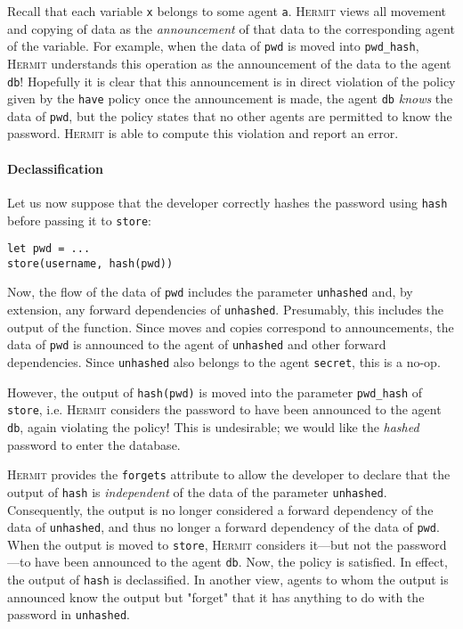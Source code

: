 \documentclass[letterpaper,twocolumn,10pt]{article}
\newcommand{\Hermit}{\textsc{Hermit}}
\begin{document}
Recall that each variable \lstinline{x} belongs to some agent \lstinline{a}.
\Hermit{} views all movement and copying of data as the \emph{announcement} of that data to the
corresponding agent of the variable. For example, when the data of \lstinline{pwd} is moved into
\lstinline{pwd_hash}, \Hermit{} understands this operation as the announcement of the data to the
agent \lstinline{db}! Hopefully it is clear that this announcement is in direct violation of the
policy given by the \lstinline{have} policy once the announcement is made, the agent
\lstinline{db} \emph{knows} the data of \lstinline{pwd}, but the policy states that no other agents
are permitted to know the password. \Hermit{} is able to compute this violation and report an error.

\paragraph{Declassification}
Let us now suppose that the developer correctly hashes the password using \lstinline{hash} before
passing it to \lstinline{store}:

\begin{lstlisting}[firstnumber=16]
let pwd = ...
store(username, hash(pwd))
\end{lstlisting}

Now, the flow of the data of \lstinline{pwd} includes the parameter \lstinline{unhashed} and, by
extension, any forward dependencies of \lstinline{unhashed}. Presumably, this includes the output of
the function. Since moves and copies correspond to announcements, the data of \lstinline{pwd} is
announced to the agent of \lstinline{unhashed} and other forward dependencies. Since
\lstinline{unhashed} also belongs to the agent \lstinline{secret}, this is a no-op.

However, the output of \lstinline{hash(pwd)} is moved into the parameter \lstinline{pwd_hash} of
\lstinline{store}, i.e. \Hermit{} considers the password to have been announced to the agent
\lstinline{db}, again violating the policy! This is undesirable; we would like the \emph{hashed}
password to enter the database.

\Hermit{} provides the \lstinline{forgets} attribute to allow the developer to declare that the
output of \lstinline{hash} is \emph{independent} of the data of the parameter \lstinline{unhashed}.
Consequently, the output is no longer considered a forward dependency of the data of
\lstinline{unhashed}, and thus no longer a forward dependency of the data of \lstinline{pwd}. When
the output is moved to \lstinline{store}, \Hermit{} considers it---but not the password---to have
been announced to the agent \lstinline{db}. Now, the policy is satisfied. In effect, the output of
\lstinline{hash} is declassified. In another view, agents to whom the output is announced know the
output but "forget" that it has anything to do with the password in \lstinline{unhashed}.
\end{document}
